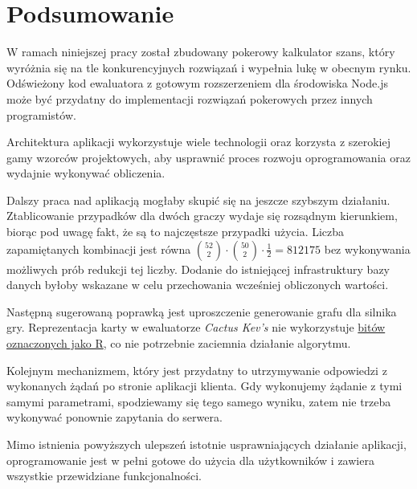 \chapter{Podsumowanie}
\label{chapter:6}

W ramach niniejszej pracy został zbudowany pokerowy kalkulator szans, który wyróżnia się na tle konkurencyjnych rozwiązań i wypełnia lukę w obecnym rynku. Odświeżony kod ewaluatora z gotowym rozszerzeniem dla środowiska Node.js może być przydatny do implementacji rozwiązań pokerowych przez innych programistów. 

Architektura aplikacji wykorzystuje wiele technologii oraz korzysta z szerokiej gamy wzorców projektowych, aby usprawnić proces rozwoju oprogramowania oraz wydajnie wykonywać obliczenia. 

Dalszy praca nad aplikacją mogłaby skupić się na jeszcze szybszym działaniu. Ztablicowanie przypadków dla dwóch graczy wydaje się rozsądnym kierunkiem, biorąc pod uwagę fakt, że są to najczęstsze przypadki użycia. Liczba zapamiętanych kombinacji jest równa $\binom{52}{2} \cdot \binom{50}{2} \cdot \frac{1}{2} = 812175$ bez wykonywania możliwych prób redukcji tej liczby. Dodanie do istniejącej infrastruktury bazy danych byłoby wskazane w celu przechowania wcześniej obliczonych wartości.

Następną sugerowaną poprawką jest uproszczenie generowanie grafu dla silnika gry. Reprezentacja karty w ewaluatorze \emph{Cactus Kev's} nie wykorzystuje \hyperref[chapter:3-r-bits]{bitów oznaczonych jako R}, co nie potrzebnie zaciemnia działanie algorytmu.

Kolejnym mechanizmem, który jest przydatny to utrzymywanie odpowiedzi z wykonanych żądań po stronie aplikacji klienta. Gdy wykonujemy żądanie z tymi samymi parametrami, spodziewamy się tego samego wyniku, zatem nie trzeba wykonywać ponownie zapytania do serwera.

Mimo istnienia powyższych ulepszeń istotnie usprawniających działanie aplikacji, oprogramowanie jest w pełni gotowe do użycia dla użytkowników i zawiera wszystkie przewidziane funkcjonalności.